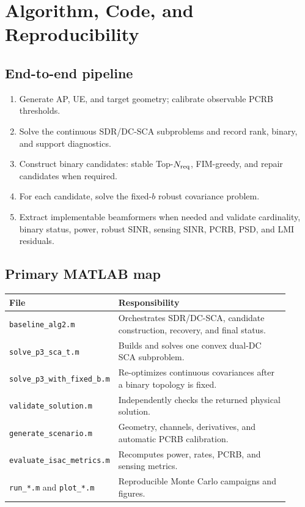 \chapter{Algorithm, Code, and Reproducibility}

\section{End-to-end pipeline}
\begin{enumerate}[label=\textbf{Step \arabic*:},leftmargin=2.4cm]
\item Generate AP, UE, and target geometry; calibrate observable PCRB thresholds.
\item Solve the continuous SDR/DC-SCA subproblems and record rank, binary, and support diagnostics.
\item Construct binary candidates: stable Top-$N_{\rm req}$, FIM-greedy, and repair candidates when required.
\item For each candidate, solve the fixed-$b$ robust covariance problem.
\item Extract implementable beamformers when needed and validate cardinality, binary status, power, robust SINR, sensing SINR, PCRB, PSD, and LMI residuals.
\end{enumerate}

\section{Primary MATLAB map}
\begin{longtable}{p{0.30\linewidth}p{0.61\linewidth}}
\toprule
File & Responsibility\\ \midrule
\texttt{baseline\_alg2.m} & Orchestrates SDR/DC-SCA, candidate construction, recovery, and final status.\\
\texttt{solve\_p3\_sca\_t.m} & Builds and solves one convex dual-DC SCA subproblem.\\
\texttt{solve\_p3\_with\_fixed\_b.m} & Re-optimizes continuous covariances after a binary topology is fixed.\\
\texttt{validate\_solution.m} & Independently checks the returned physical solution.\\
\texttt{generate\_scenario.m} & Geometry, channels, derivatives, and automatic PCRB calibration.\\
\texttt{evaluate\_isac\_metrics.m} & Recomputes power, rates, PCRB, and sensing metrics.\\
\texttt{run\_*.m} and \texttt{plot\_*.m} & Reproducible Monte Carlo campaigns and figures.\\
\bottomrule
\end{longtable}

